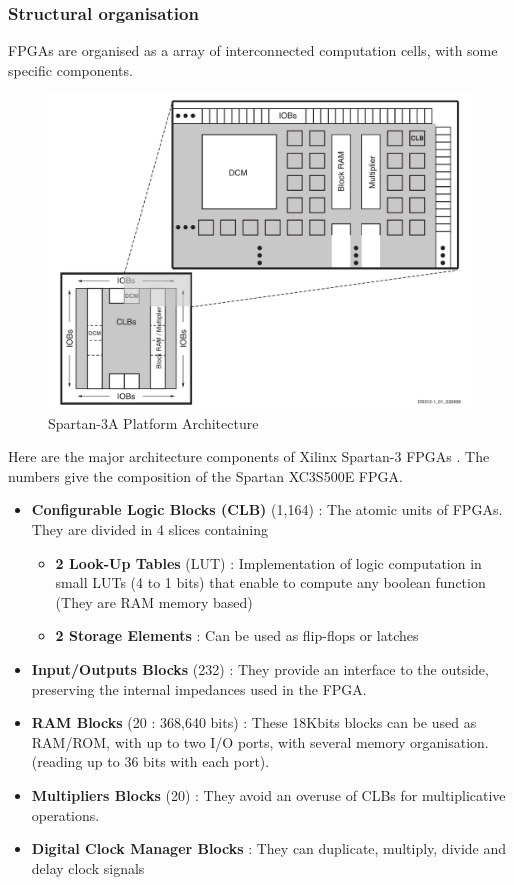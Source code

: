 \documentclass[10pt,a4paper]{article}
\begin{document}
\subsubsection{Structural organisation}

FPGAs are organised as a array of interconnected computation cells, with some specific components.

\begin{figure}[h]
	\includegraphics[scale=0.3]{Spartan.png}
	\caption{Spartan-3A Platform Architecture \cite{Spartan}}
\end{figure}

Here are the major architecture components of Xilinx Spartan-3 FPGAs \cite{Spartan}. 
The numbers give the composition of the Spartan XC3S500E FPGA.

\begin{itemize}
	\item \textbf{Configurable Logic Blocks (CLB)} (1,164) : The atomic units of FPGAs.
	They are divided in 4 slices  containing
	\begin{itemize}
		\item \textbf{2 Look-Up Tables} (LUT) : Implementation of logic computation in small LUTs (4 to 1 bits) that enable to compute any boolean function (They are RAM memory based)
		\item \textbf{2 Storage Elements} : Can be used as flip-flops or latches
	\end{itemize}
	\item \textbf{Input/Outputs Blocks} (232) : They provide an interface to the outside, preserving the internal impedances used in the FPGA.
	\item \textbf{RAM Blocks} (20 : 368,640 bits) : These 18Kbits blocks can be used as RAM/ROM, with up to two I/O ports, with several memory organisation. (reading up to 36 bits with each port).
	\item \textbf{Multipliers Blocks} (20) : They avoid an overuse of CLBs for multiplicative operations.
	\item \textbf{Digital Clock Manager Blocks} : They can duplicate, multiply, divide and delay clock signals
	
\end{itemize}
\end{document}
